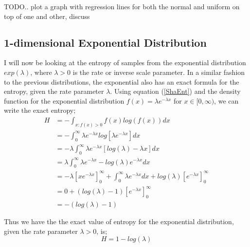 \documentclass{article}
\begin{document}
TODO.. plot a graph with regression lines for both the normal and uniform on top of one and other, discuss



\subsection{1-dimensional Exponential Distribution}

I will now be looking at the entropy of samples from the exponential distribution $exp(\lambda)$, where $\lambda > 0$ is the rate or inverse scale parameter. In a similar fashion to the previous distributions, the exponential also has an exact formula for the entropy, given the rate parameter $\lambda$. Using equation (\ref{ShaEnt}) and the density function for the exponential distribution $f(x) = \lambda e^{-\lambda x}$ for $x \in [0, \infty)$, we can write the exact entropy;
\begin{align*}
H &= - \int_{x : f(x) > 0} f(x) log(f(x)) dx \\ 
&= - \int_{0}^{\infty} \lambda e^{-\lambda x} log [ \lambda e^{-\lambda x} ] dx  \\
&= - \lambda \int_{0}^{\infty} \lambda e^{-\lambda x} [log(\lambda) - \lambda x] dx  \\
&= \lambda \int_{0}^{\infty} \lambda e^{-\lambda x} - log(\lambda) e^{-\lambda x} dx \\
&= - \lambda \left[x e^{-\lambda x}\right]_{0}^{\infty} + \int_{0}^{\infty}\lambda e^{-\lambda x} dx + log(\lambda) \left[ e^{-\lambda x}\right]_{0}^{\infty} \\
&= 0 + (log(\lambda) - 1) \left[e^{-\lambda x} \right]_{0}^{\infty} \\
&= -(log(\lambda) - 1)
\end{align*}

Thus we have the the exact value of entropy for the exponential distribution, given the rate parameter $\lambda > 0$, is;
\begin{equation} \label{ExpEnt}
H = 1 - log(\lambda)
\end{equation}
\end{document}
